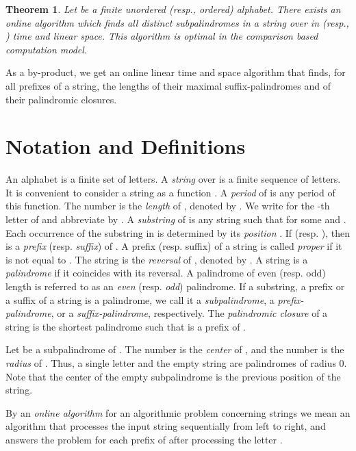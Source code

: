 \documentclass{article}
\theoremstyle{plain}
\newtheorem{theorem}{Theorem}[section]
\theoremstyle{definition}
\begin{document}
\begin{theorem} \label{main}
Let  be a finite unordered (resp., ordered) alphabet.
There exists an online algorithm which finds all distinct subpalindromes in a string over  in  (resp., ) time and linear space. This algorithm is optimal in the comparison based computation model.
\end{theorem}

As a by-product, we get an online linear time and space algorithm that finds, for all prefixes of a string, the lengths of their maximal suffix-palindromes and of their palindromic closures.


\section{Notation and Definitions}

An alphabet  is a finite set of letters. A \emph{string}  over  is a finite sequence of letters. It is convenient to consider a string as a function . A \emph{period} of  is any period of this function. The number  is the \emph{length} of , denoted by . We write  for the -th letter of  and abbreviate  by .  A \emph{substring} of  is any string  such that  for some  and . Each occurrence of the substring  in  is determined by its \emph{position} . If  (resp. ), then  is a \emph{prefix} (resp. \emph{suffix}) of . A prefix (resp. suffix) of a string  is called \emph{proper} if it is not equal to . The string  is the \emph{reversal} of , denoted by . A string is a \emph{palindrome} if it coincides with its reversal. A palindrome of even (resp. odd) length is referred to as an \emph{even} (resp. \emph{odd}) palindrome. If a substring, a prefix or a suffix of a string is a palindrome,  we call it a \emph{subpalindrome}, a \emph{prefix-palindrome}, or a \emph{suffix-palindrome}, respectively. The \emph{palindromic closure} of a string  is the shortest palindrome  such that  is a prefix of .

Let  be a subpalindrome of . The number  is the \emph{center} of , and the number  is the \emph{radius} of . Thus, a single letter and the empty string are palindromes of radius 0. Note that the center of the empty subpalindrome is the previous position of the string.

By an \emph{online algorithm} for an algorithmic problem concerning strings we mean an algorithm that processes the input string  sequentially from left to right, and answers the problem for each prefix  of  after processing the letter .
\end{document}
